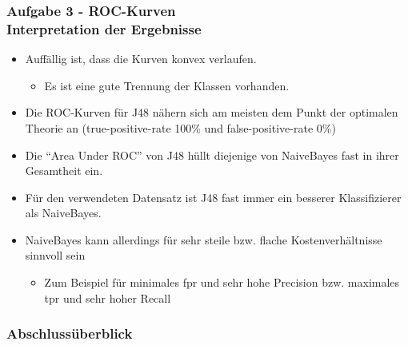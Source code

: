 \documentclass[accentcolor=tud6b,colorbacktitle,inverttitle,landscape,german,presentation,t]{tudbeamer}
\begin{document}
    \begin{frame}[t]
    \frametitle{Aufgabe 3 - ROC-Kurven\\ Interpretation der Ergebnisse}
    \begin{itemize}
            \item  Auffällig ist, dass die Kurven konvex verlaufen.
            \begin{itemize}
         		\item  Es ist eine gute Trennung der Klassen vorhanden.		
	\end{itemize} 
	\item Die ROC-Kurven für J48 nähern sich am meisten dem Punkt der optimalen Theorie an (true-positive-rate 100\% und false-positive-rate 0\%)
	\item  Die ``Area Under ROC'' von J48 hüllt diejenige von NaiveBayes fast in ihrer Gesamtheit ein.
	\end{itemize}                     
        \begin{itemize}
         		\item  Für den verwendeten Datensatz ist J48 fast immer ein besserer Klassifizierer als NaiveBayes.
		\item NaiveBayes kann allerdings für sehr steile bzw. flache Kostenverhältnisse sinnvoll sein
		\begin{itemize}
		 \item Zum Beispiel für minimales fpr und sehr hohe Precision bzw. maximales tpr und sehr hoher Recall
		 \end{itemize}
	\end{itemize} 
    \end{frame}

\begin{frame}
\frametitle{Abschlussüberblick}
\tableofcontents
\begin{center}
\end{center}
\end{frame}
\end{document}
